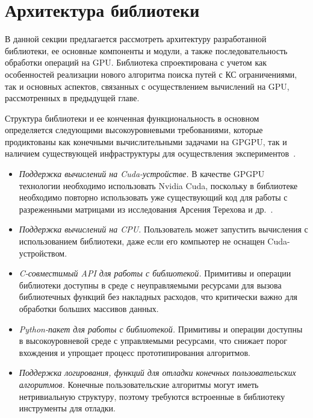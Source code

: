 \section{Архитектура библиотеки}

В данной секции предлагается рассмотреть архитектуру разработанной библиотеки, ее основные компоненты и модули, а также последовательность обработки операций на GPU. Библиотека спроектирована с учетом как особенностей реализации нового алгоритма поиска путей с КС ограничениями, так и основных аспектов, связанных с осуществлением вычислений на GPU, рассмотренных в предыдущей главе.

Структура библиотеки и ее конченная функциональность в основном определяется следующими высокоуровневыми требованиями, которые продиктованы как конечными вычислительными задачами на GPGPU, так и наличием существующей инфраструктуры для осуществления экспериментов~\cite{net:cfpq_py_algo}.

\begin{itemize}[noitemsep,topsep=0pt,parsep=0pt,partopsep=0pt]
    \item \textit{Поддержка вычислений на Cuda-устройстве.} В качестве GPGPU технологии необходимо использовать Nvidia Cuda, поскольку в библиотеке необходимо повторно использовать уже существующий код для работы с разреженными матрицами из исследования Арсения Терехова и др.~\cite{inproceedings:cfqp_matrix_with_single_source}.
    \item \textit{Поддержка вычислений на CPU.} Пользователь может запустить вычисления с использованием библиотеки, даже если его компьютер не оснащен Cuda-устройством.
    \item \textit{C-совместимый API для работы с библиотекой.} Примитивы и операции библиотеки доступны в среде с неуправляемыми ресурсами для вызова библиотечных функций без накладных расходов, что критически важно для обработки больших массивов данных.
    \item \textit{Python-пакет для работы с библиотекой.} Примитивы и операции доступны в высокоуровневой среде с управляемыми ресурсами, что снижает порог вхождения и упрощает процесс прототипирования алгоритмов.
    \item \textit{Поддержка логирования, функций для отладки конечных пользовательских алгоритмов.} Конечные пользовательские алгоритмы могут иметь нетривиальную структуру, поэтому требуются встроенные в библиотеку инструменты для отладки.
\end{itemize}


